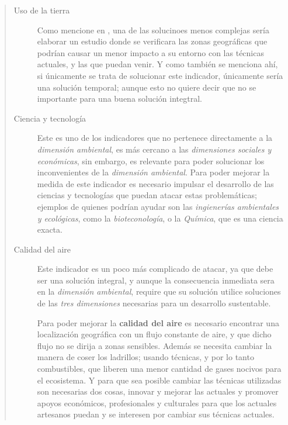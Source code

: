 \documentclass[12pt]{article}
\begin{document}
	\begin{quote}\begin{description}

		\item [Uso de la tierra] Como mencione en \cite{actividad3}, una de las solucinoes menos complejas ser\'ia elaborar un estudio donde se verificara las zonas geogr\'aficas que podr\'ian causar un menor impacto a su entorno con las t\'ecnicas actuales, y las que puedan venir. Y como tambi\'en se menciona ah\'i, si \'unicamente se trata de solucionar este indicador, \'unicamente ser\'ia una soluci\'on temporal; aunque esto no quiere decir que no se importante para una buena soluci\'on integtral.

		\item [Ciencia y tecnolog\'ia] Este es uno de los indicadores que no pertenece directamente a la \textit{dimensi\'on ambiental}, es m\'as cercano a las \textit{dimensiones sociales y econ\'omicas}, sin embargo, es relevante para poder solucionar los inconvenientes de la \textit{dimensi\'on ambiental}. Para poder mejorar la medida de este indicador es necesario impulsar el desarrollo de las ciencias y tecnolog\'ias que puedan atacar estas problem\'aticas; ejemplos de quienes podr\'ian ayudar son las \textit{ingiener\'ias ambientales y ecol\'ogicas}, como la \textit{bioteconolog\'ia}, o la \textit{Qu\'imica}, que es una ciencia exacta.

		\item [Calidad del aire] Este indicador es un poco m\'as complicado de atacar, ya que debe ser una soluci\'on integral, y aunque la consecuencia inmediata sera en la \textit{dimensi\'on ambiental}, require que su soluci\'on utilice soluciones de las \textit{tres dimensiones} necesarias para un desarrollo sustentable.
		\par Para poder mejorar la \textbf{calidad del aire} es necesario encontrar una localizaci\'on geogr\'afica con un flujo constante de aire, y que dicho flujo no se dirija a zonas sensibles. Adem\'as se necesita cambiar la manera de coser los ladrillos; usando t\'ecnicas, y por lo tanto combustibles, que liberen una menor cantidad de gases nocivos para el ecosistema. Y para que sea posible cambiar las t\'ecnicas utilizadas son necesarias dos cosas, innovar y mejorar las actuales y promover apoyos econ\'omicos, profesionales y culturales para que los actuales artesanos puedan y se interesen por cambiar sus t\'ecnicas actuales. 

	\end{description}\end{quote}
	
\end{document}
